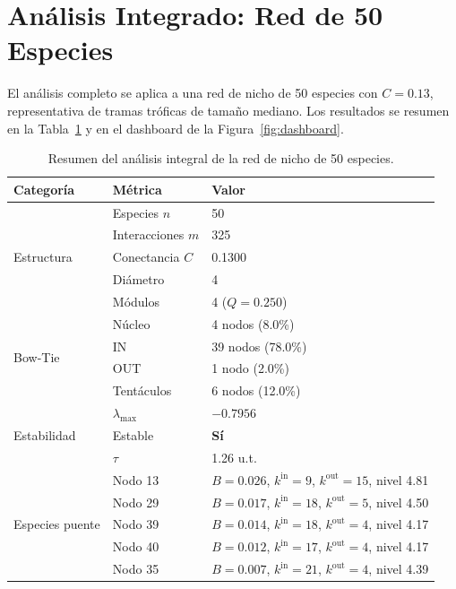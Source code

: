 \documentclass[12pt, a4paper]{article}
\newcommand{\Req}{\lambda_{\max}}
\begin{document}
\section{Análisis Integrado: Red de 50 Especies}

El análisis completo se aplica a una red de nicho de 50 especies con $C = 0.13$,
representativa de tramas tróficas de tamaño mediano. Los resultados se resumen en
la Tabla~\ref{tab:resumen50} y en el dashboard de la Figura~\ref{fig:dashboard}.

\begin{table}[H]
\centering
\caption{Resumen del análisis integral de la red de nicho de 50 especies.}
\label{tab:resumen50}
\renewcommand{\arraystretch}{1.3}
\begin{tabular}{lll}
\toprule
\textbf{Categoría} & \textbf{Métrica} & \textbf{Valor} \\
\midrule
\multirow{5}{*}{Estructura}
  & Especies $n$           & 50 \\
  & Interacciones $m$      & 325 \\
  & Conectancia $C$        & 0.1300 \\
  & Diámetro               & 4 \\
  & Módulos                & 4 ($Q = 0.250$) \\
\midrule
\multirow{4}{*}{Bow-Tie}
  & Núcleo              & 4 nodos (8.0\%) \\
  & IN                  & 39 nodos (78.0\%) \\
  & OUT                 & 1 nodo (2.0\%) \\
  & Tentáculos          & 6 nodos (12.0\%) \\
\midrule
\multirow{3}{*}{Estabilidad}
  & $\Req$              & $-0.7956$ \\
  & Estable             & \textcolor{verde}{\textbf{Sí}} \\
  & $\tau$              & 1.26 u.t. \\
\midrule
\multirow{5}{*}{Especies puente}
  & Nodo 13 & $B = 0.026$, $k^{\text{in}}=9$, $k^{\text{out}}=15$, nivel 4.81 \\
  & Nodo 29 & $B = 0.017$, $k^{\text{in}}=18$, $k^{\text{out}}=5$, nivel 4.50 \\
  & Nodo 39 & $B = 0.014$, $k^{\text{in}}=18$, $k^{\text{out}}=4$, nivel 4.17 \\
  & Nodo 40 & $B = 0.012$, $k^{\text{in}}=17$, $k^{\text{out}}=4$, nivel 4.17 \\
  & Nodo 35 & $B = 0.007$, $k^{\text{in}}=21$, $k^{\text{out}}=4$, nivel 4.39 \\
\bottomrule
\end{tabular}
\end{table}
\end{document}
